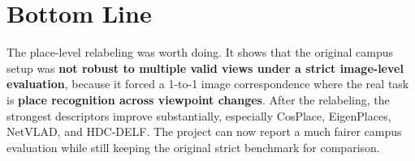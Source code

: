 \documentclass[11pt]{article}
\begin{document}
\section*{Bottom Line}
The place-level relabeling was worth doing. It shows that the original campus setup was \textbf{not robust to multiple valid views under a strict image-level evaluation}, because it forced a 1-to-1 image correspondence where the real task is \textbf{place recognition across viewpoint changes}. After the relabeling, the strongest descriptors improve substantially, especially CosPlace, EigenPlaces, NetVLAD, and HDC-DELF. The project can now report a much fairer campus evaluation while still keeping the original strict benchmark for comparison.
\end{document}

